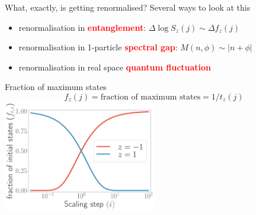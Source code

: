 \documentclass[11pt,aspectratio=169]{beamer}
\newcommand{\focus}[1]{\textcolor{red}{\bf{#1}}}
\begin{document}
\begin{frame}{What, exactly, is getting renormalised?}
	Several ways to look at this\\[10pt]
	\begin{itemize}
		\item renormalisation in \focus{entanglement}: \(\Delta \log S_z(j) \sim \Delta f_z(j) \)\\[10pt]
		\item renormalisation in 1-particle \focus{spectral gap}: \(M(n,\phi) \sim |n + \phi|\)\\[10pt]
		\item renormalisation in real space \focus{quantum fluctuation}\\[10pt]
	\end{itemize}
\end{frame}

\begin{frame}{Fraction of maximum states}
	\centering
	\[f_z(j) = \text{fraction of maximum states} = 1/t_z(j)\]
	\includegraphics[width=0.5\textwidth]{figures/fraction.pdf}
\end{frame}
\end{document}
